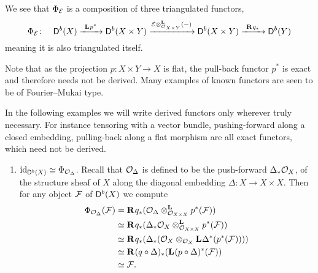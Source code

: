 \begin{remark}
    We see that $\fm{\E}$ is a composition of three triangulated functors,
    \[
        \fm{\E} \colon \quad \derb{X} \xrightarrow{\ \lderived{}{p^*} \ } \derb{X \times Y} \xrightarrow{\derivedtensor{\E}{(-)}{\struct{X \times Y}}} \derb{X \times Y} \xrightarrow{\ \rderived{}{q_*} \ } \derb{Y}
    \]
    meaning it is also triangulated itself.  
\end{remark}

Note that as the projection $p \colon X \times Y \to X$ is flat, the pull-back functor $p^*$ is exact and therefore needs not be derived. Many examples of known functors are seen to be of Fourier--Mukai type.

\begin{example}
    \label{Identifying fm transforms}
    In the following examples we will write derived functors only wherever truly necessary. For instance tensoring with a vector bundle, pushing-forward along a closed embedding, pulling-back along a flat morphism are all exact functors, which need not be derived.
\begin{enumerate}[label = (\roman*)]
    \item{
    $\id{\derb{X}} \iso \fm{\struct{\Delta}}$. Recall that $\struct{\Delta}$ is defined to be the push-forward $\Delta_*\struct{X}$, of the structure sheaf of $X$ along the diagonal embedding $\Delta \colon X \to X \times X$. Then for any object $\F$ of $\derb{X}$ we compute 
    \begin{align*}
        \fm{\struct{\Delta}}(\F) &= \rderived{}{q_*}(\derivedtensor{\struct{\Delta}}{p^*(\F)}{\struct{X \times X}}) \\
        &\iso \rderived{}{q_*}(\derivedtensor{\Delta_*\struct{X}}{{p^*}(\F)}{\struct{X \times X}}) \\
        &\iso \rderived{}{q_*}(\Delta_*(\struct{X} \otimes_{\struct{X}}\lderived{}{\Delta^*}({p^*}(\F)))) \\
        &\iso \rderived{}{(q \circ \Delta)_*}(\lderived{}{(p \circ \Delta)^*}(\F)) \\
        &\iso \F.
    \end{align*}
}
\end{enumerate}
\end{example}
